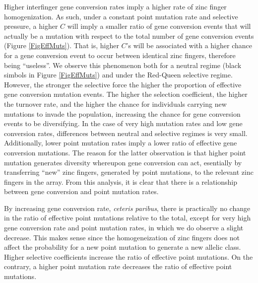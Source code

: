 \documentclass[a4paper,10pt]{article}
\begin{document}
Higher interfinger gene conversion rates imply a higher rate of zinc finger homogenization. As such, under a constant point mutation rate and selective pressure, a higher $C$ will imply a smaller ratio of gene conversion events that will actually be a mutation with respect to the total number of gene conversion events (Figure \ref{FigEffMuts}). That is, higher $C$'s will be associated with a higher chance for a gene conversion event to occur between identical zinc fingers, therefore being ``useless''. We observe this phenomenon both for a neutral regime (black simbols in Figure \ref{FigEffMuts}) and under the Red-Queen selective regime. However, the stronger the selective force the higher the proportion of effective gene conversion mutation events. The higher the selection coefficient, the higher the turnover rate, and the higher the chance for individuals carrying new mutations to invade the population, increasing the chance for gene conversion events to be diversifying. In the case of very high mutation rates and low gene conversion rates, differences between neutral and selective regimes is very small. Additionally, lower point mutation rates imply a lower ratio of effective gene conversion mutations. The reason for the latter observation is that higher point mutation generates diversity whereupon gene conversion can act, esentially by transferring ``new'' zinc fingers, generated by point mutations, to the relevant zinc fingers in the array. From this analysis, it is clear that there is a relationship between gene conversion and point mutation rates. 

By increasing gene conversion rate, \textit{ceteris paribus}, there is practically no change in the ratio of effective point mutations relative to the total, except for very high gene conversion rate and point mutation rates, in which we do observe a slight decrease. This makes sense since the homogeneization of zinc fingers does not affect the probability for a new point mutation to generate a new allelic class. Higher selective coefficients increase the ratio of effective point mutations. %
On the contrary, a higher point mutation rate decreases the ratio of effective point mutations. 
\end{document}
